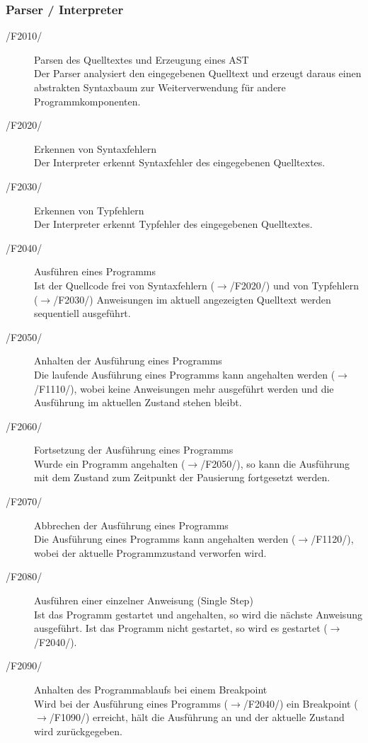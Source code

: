 \documentclass[a4paper,10pt]{article}
\begin{document}
\subsubsection{Parser / Interpreter}
\begin{description}
\item[/F2010/] Parsen des Quelltextes und Erzeugung eines AST\\
Der Parser analysiert den eingegebenen Quelltext und erzeugt daraus einen abstrakten Syntaxbaum zur Weiterverwendung f\"{u}r andere Programmkomponenten.
\item[/F2020/] Erkennen von Syntaxfehlern\\
Der Interpreter erkennt Syntaxfehler des eingegebenen Quelltextes.
\item[/F2030/] Erkennen von Typfehlern\\
Der Interpreter erkennt Typfehler des eingegebenen Quelltextes.
\item[/F2040/] Ausf\"{u}hren eines Programms\\
Ist der Quellcode frei von Syntaxfehlern ($\to$/F2020/) und von Typfehlern ($\to$/F2030/) Anweisungen im aktuell angezeigten Quelltext werden sequentiell ausgef\"{u}hrt.
\item[/F2050/] Anhalten der Ausf\"{u}hrung eines Programms\\
Die laufende Ausf\"{u}hrung eines Programms kann angehalten werden ($\to$/F1110/), wobei keine Anweisungen mehr ausgef\"{u}hrt werden und die Ausf\"{u}hrung im aktuellen Zustand stehen bleibt.
\item[/F2060/] Fortsetzung der Ausf\"{u}hrung eines Programms\\
Wurde ein Programm angehalten ($\to$/F2050/), so kann die Ausf\"{u}hrung mit dem Zustand zum Zeitpunkt der Pausierung fortgesetzt werden.
\item[/F2070/] Abbrechen der Ausf\"{u}hrung eines Programms\\
Die Ausf\"{u}hrung eines Programms kann angehalten werden ($\to$/F1120/), wobei der aktuelle Programmzustand verworfen wird.
\item[/F2080/] Ausf\"{u}hren einer einzelner Anweisung (Single Step)\\
Ist das Programm gestartet und angehalten, so wird die n\"{a}chste Anweisung ausgef\"{u}hrt. Ist das Programm nicht gestartet, so wird es gestartet ($\to$/F2040/).
\item[/F2090/] Anhalten des Programmablaufs bei einem Breakpoint\\
Wird bei der Ausf\"{u}hrung eines Programms ($\to$/F2040/) ein Breakpoint ($\to$/F1090/) erreicht, h\"{a}lt die Ausf\"{u}hrung an und der aktuelle Zustand wird zur\"{u}ckgegeben.

\end{description}
\end{document}
